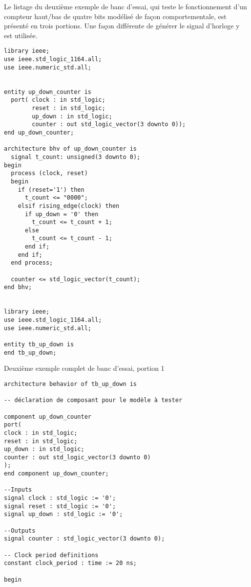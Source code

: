 \documentclass[letter, oneside]{book}
\begin{document}
\begin{enumerate}
Le listage du deuxième exemple de banc d'essai, qui teste le
fonctionnement d'un compteur haut/bas de quatre bits modélisé de façon
comportementale, est présenté en trois portions. Une façon différente
de générer le signal d'horloge y est utilisée.

\begin{listing}[htbp]
\begin{verbatim}
library ieee;
use ieee.std_logic_1164.all;
use ieee.numeric_std.all;


entity up_down_counter is
  port( clock : in std_logic;
        reset : in std_logic;
        up_down : in std_logic;
        counter : out std_logic_vector(3 downto 0));
end up_down_counter;

architecture bhv of up_down_counter is
  signal t_count: unsigned(3 downto 0);
begin
  process (clock, reset)
  begin
    if (reset='1') then
      t_count <= "0000";
    elsif rising_edge(clock) then
      if up_down = '0' then
        t_count <= t_count + 1;
      else
        t_count <= t_count - 1;
      end if;
    end if;
  end process;

  counter <= std_logic_vector(t_count);
end bhv;


library ieee;
use ieee.std_logic_1164.all;
use ieee.numeric_std.all;

entity tb_up_down is
end tb_up_down;

\end{verbatim}
\caption{Deuxième exemple complet de banc d'essai, portion 1}
\end{listing}

\begin{listing}[htbp]
\begin{verbatim}
architecture behavior of tb_up_down is

-- déclaration de composant pour le modèle à tester

component up_down_counter
port(
clock : in std_logic;
reset : in std_logic;
up_down : in std_logic;
counter : out std_logic_vector(3 downto 0)
);
end component up_down_counter;

--Inputs
signal clock : std_logic := '0';
signal reset : std_logic := '0';
signal up_down : std_logic := '0';

--Outputs
signal counter : std_logic_vector(3 downto 0);

-- Clock period definitions
constant clock_period : time := 20 ns;

begin


\end{verbatim}
\end{listing}
\end{enumerate}
\end{document}
